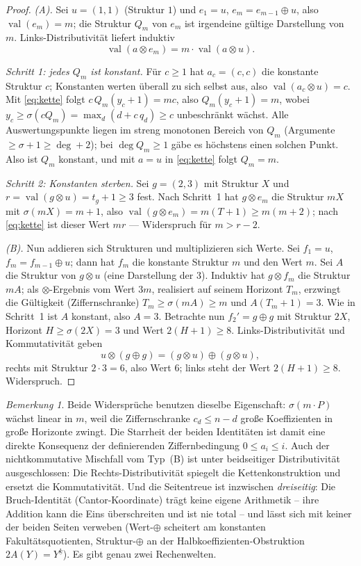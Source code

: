 \documentclass[11pt]{article}
\theoremstyle{definition}
\theoremstyle{remark}
\newtheorem{bemerkung}[satz]{Bemerkung}
\newcommand{\val}{\operatorname{val}}
\begin{document}
\begin{proof}
\emph{(A).} Sei $u=(1,1)$ (Struktur $1$) und $e_1=u$,
$e_m=e_{m-1}\oplus u$, also $\val(e_m)=m$; die Struktur $Q_m$ von
$e_m$ ist irgendeine gültige Darstellung von $m$.
Links-Distributivität liefert induktiv
\begin{equation}\label{eq:kette}
\val(a\otimes e_m)=m\cdot\val(a\otimes u).
\end{equation}

\emph{Schritt 1: jedes $Q_m$ ist konstant.} Für $c\ge1$ hat
$a_c=(c,c)$ die konstante Struktur $c$; Konstanten werten überall zu
sich selbst aus, also $\val(a_c\otimes u)=c$. Mit \eqref{eq:kette}
folgt $c\,Q_m(y_c{+}1)=mc$, also $Q_m(y_c{+}1)=m$, wobei
$y_c\ge\sigma(cQ_m)=\max_d(d+c\,q_d)\ge c$ unbeschränkt wächst. Alle
Auswertungspunkte liegen im streng monotonen Bereich von $Q_m$
(Argumente $\ge\sigma+1\ge\deg+2$); bei $\deg Q_m\ge1$ gäbe es
höchstens einen solchen Punkt. Also ist $Q_m$ konstant, und mit
$a=u$ in \eqref{eq:kette} folgt $Q_m=m$.

\emph{Schritt 2: Konstanten sterben.} Sei $g=(2,3)$ mit Struktur
$X$ und $r=\val(g\otimes u)=t_g{+}1\ge3$ fest. Nach Schritt~1 hat
$g\otimes e_m$ die Struktur $mX$ mit $\sigma(mX)=m{+}1$, also
$\val(g\otimes e_m)=m(T{+}1)\ge m(m{+}2)$; nach \eqref{eq:kette}
ist dieser Wert $mr$ --- Widerspruch für $m>r-2$.

\emph{(B).} Nun addieren sich Strukturen und multiplizieren sich
Werte. Sei $f_1=u$, $f_m=f_{m-1}\oplus u$; dann hat $f_m$ die
konstante Struktur $m$ und den Wert $m$. Sei $A$ die Struktur von
$g\otimes u$ (eine Darstellung der $3$). Induktiv hat $g\otimes f_m$
die Struktur $mA$; als $\otimes$-Ergebnis vom Wert $3m$, realisiert
auf seinem Horizont $T_m$, erzwingt die Gültigkeit (Ziffernschranke)
$T_m\ge\sigma(mA)\ge m$ und $A(T_m{+}1)=3$. Wie in Schritt~1 ist
$A$ konstant, also $A=3$. Betrachte nun $f_2'=g\oplus g$ mit
Struktur $2X$, Horizont $H\ge\sigma(2X)=3$ und Wert
$2(H{+}1)\ge8$. Links-Distributivität und Kommutativität geben
\[
u\otimes(g\oplus g)=(g\otimes u)\oplus(g\otimes u),
\]
rechts mit Struktur $2\cdot3=6$, also Wert $6$; links steht der Wert
$2(H{+}1)\ge8$. Widerspruch.
\end{proof}

\begin{bemerkung}
Beide Widersprüche benutzen dieselbe Eigenschaft:
$\sigma(m\cdot P)$ wächst linear in $m$, weil die Ziffernschranke
$c_d\le n-d$ große Koeffizienten in große Horizonte zwingt. Die
Starrheit der beiden Identitäten ist damit eine direkte Konsequenz
der definierenden Ziffernbedingung $0\le a_i\le i$. Auch der
nichtkommutative Mischfall vom Typ~(B) ist unter beidseitiger
Distributivität ausgeschlossen: Die Rechts-Distributivität spiegelt
die Kettenkonstruktion und ersetzt die Kommutativität. Und die
Seitentreue ist inzwischen \emph{dreiseitig}: Die Bruch-Identität
(Cantor-Koordinate) trägt keine eigene Arithmetik -- ihre Addition
kann die Eins überschreiten und ist nie total -- und lässt sich mit
keiner der beiden Seiten verweben (Wert-$\oplus$ scheitert am
konstanten Fakultätsquotienten, Struktur-$\oplus$ an der
Halbkoeffizienten-Obstruktion $2A(Y)=Y^{\underline k}$).
Es gibt genau zwei Rechenwelten.
\end{bemerkung}
\end{document}
